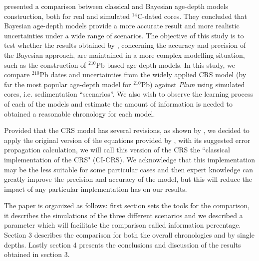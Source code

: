 \documentclass [10pt] {article}
\begin{document}
\citet{Blaauw2018} presented a comparison between classical and Bayesian age-depth models construction, both for real and simulated $^{14}$C-dated cores.
They concluded that Bayesian age-depth models provide a more accurate result and more realistic uncertainties under a wide range of scenarios.  
The objective of this study is to test whether the results obtained by \citet{Blaauw2018}, concerning the accuracy and precision of the Bayesian approach, are maintained in a more complex modelling situation, such as the construction of $^{210}$Pb-based age-depth models.
In this study, we compare $^{210}$Pb dates and uncertainties from the widely applied CRS model (by far the most popular age-depth model for $^{210}$Pb) against \textit{Plum} using simulated cores, i.e. sedimentation ``scenarios''.
We also wish to observe the learning process of each of the models and estimate the amount of information is needed to obtained a reasonable chronology for each model. 

Provided that the CRS model has several revisions, as shown by \citet{Barsanti2020}, we decided to apply the original version of the equations provided by \citet{Appleby2001}, with its suggested error propagation calculation, we will call this version of the CRS the ``classical implementation of the CRS" (CI-CRS). 
We acknowledge that this implementation may be the less suitable for some particular cases and then expert knowledge can greatly improve the precision and accuracy of the model, but this will reduce the impact of any particular implementation has on our results.

The paper is organized as follows: first section sets the tools for the comparison, it describes the simulations of the three different scenarios and we described a parameter which will facilitate the comparison called information percentage. 
Section 3 describes the comparison for both the overall chronologies and by single depths.
Lastly section 4 presents the conclusions and discussion of the results obtained in section 3. 
\end{document}
